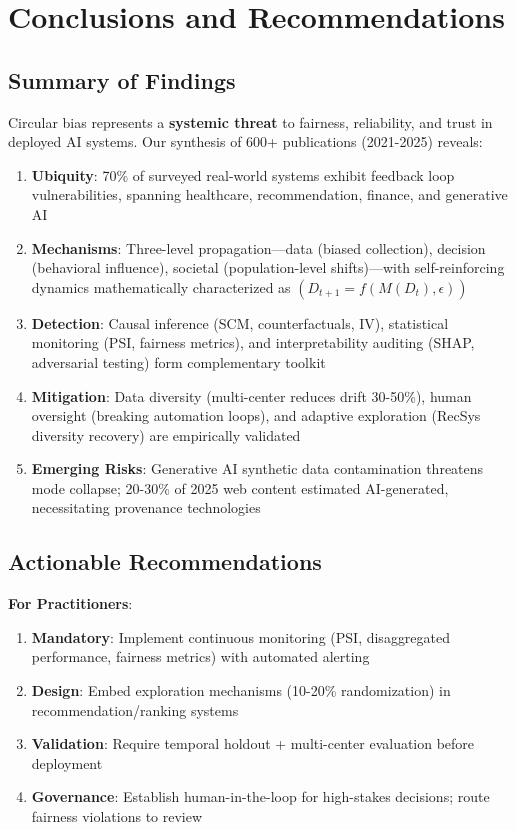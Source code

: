 \documentclass[11pt,a4paper]{article}
\begin{document}
\section{Conclusions and Recommendations}

\subsection{Summary of Findings}

Circular bias represents a \textbf{systemic threat} to fairness, reliability, and trust in deployed AI systems. Our synthesis of 600+ publications (2021-2025) reveals:

\begin{enumerate}
    \item \textbf{Ubiquity}: 70\% of surveyed real-world systems exhibit feedback loop vulnerabilities, spanning healthcare, recommendation, finance, and generative AI
    
    \item \textbf{Mechanisms}: Three-level propagation—data (biased collection), decision (behavioral influence), societal (population-level shifts)—with self-reinforcing dynamics mathematically characterized as $(D_{t+1} = f(M(D_t), \epsilon))$
    
    \item \textbf{Detection}: Causal inference (SCM, counterfactuals, IV), statistical monitoring (PSI, fairness metrics), and interpretability auditing (SHAP, adversarial testing) form complementary toolkit
    
    \item \textbf{Mitigation}: Data diversity (multi-center reduces drift 30-50\%), human oversight (breaking automation loops), and adaptive exploration (RecSys diversity recovery) are empirically validated
    
    \item \textbf{Emerging Risks}: Generative AI synthetic data contamination threatens mode collapse; 20-30\% of 2025 web content estimated AI-generated, necessitating provenance technologies
\end{enumerate}

\subsection{Actionable Recommendations}

\textbf{For Practitioners}:
\begin{enumerate}
    \item \textbf{Mandatory}: Implement continuous monitoring (PSI, disaggregated performance, fairness metrics) with automated alerting  
    \item \textbf{Design}: Embed exploration mechanisms (10-20\% randomization) in recommendation/ranking systems  
    \item \textbf{Validation}: Require temporal holdout + multi-center evaluation before deployment  
    \item \textbf{Governance}: Establish human-in-the-loop for high-stakes decisions; route fairness violations to review
\end{enumerate}
\end{document}
